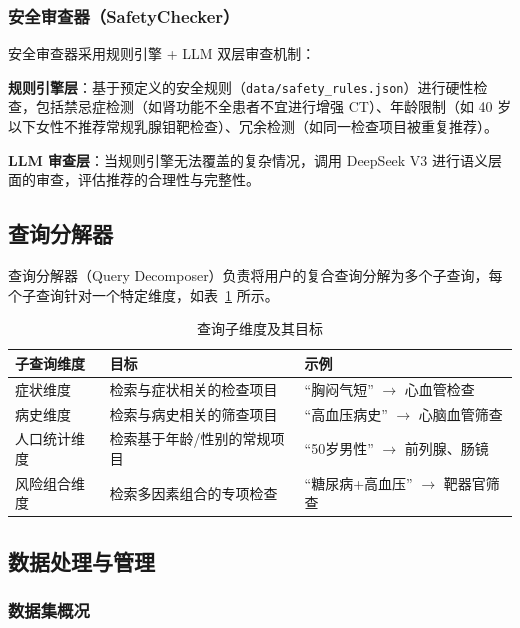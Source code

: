 \documentclass[12pt,a4paper]{article}
\begin{document}
\subsubsection{安全审查器（SafetyChecker）}

安全审查器采用规则引擎 + LLM 双层审查机制：

\textbf{规则引擎层}：基于预定义的安全规则（\texttt{data/safety\_rules.json}）进行硬性检查，包括禁忌症检测（如肾功能不全患者不宜进行增强 CT）、年龄限制（如 40 岁以下女性不推荐常规乳腺钼靶检查）、冗余检测（如同一检查项目被重复推荐）。

\textbf{LLM 审查层}：当规则引擎无法覆盖的复杂情况，调用 DeepSeek V3 进行语义层面的审查，评估推荐的合理性与完整性。

\subsection{查询分解器}

查询分解器（Query Decomposer）负责将用户的复合查询分解为多个子查询，每个子查询针对一个特定维度，如表~\ref{tab:facets} 所示。

\begin{table}[H]
    \centering
    \caption{查询子维度及其目标}
    \label{tab:facets}
    \begin{tabular}{lll}
        \toprule
        \textbf{子查询维度} & \textbf{目标} & \textbf{示例} \\
        \midrule
        症状维度     & 检索与症状相关的检查项目   & “胸闷气短” $\to$ 心血管检查 \\
        病史维度     & 检索与病史相关的筛查项目   & “高血压病史” $\to$ 心脑血管筛查 \\
        人口统计维度 & 检索基于年龄/性别的常规项目 & “50岁男性” $\to$ 前列腺、肠镜 \\
        风险组合维度 & 检索多因素组合的专项检查   & “糖尿病+高血压” $\to$ 靶器官筛查 \\
        \bottomrule
    \end{tabular}
\end{table}

\subsection{数据处理与管理}

\subsubsection{数据集概况}
\end{document}
